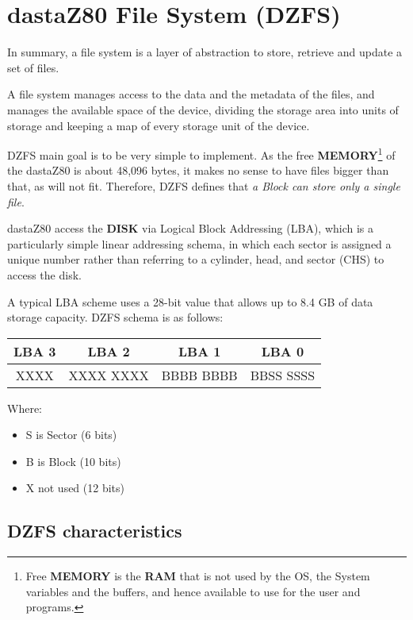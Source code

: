 \section{dastaZ80 File System (DZFS)}
In summary, a file system is a layer of abstraction to store, retrieve and
update a set of files.

A file system manages access to the data and the metadata of the files, and
manages the available space of the device, dividing the storage area into
units of storage and keeping a map of every storage unit of the device.

DZFS main goal is to be very simple to implement. As the free
\textbf{MEMORY}\footnote{Free \textbf{MEMORY} is the \textbf{RAM} that is not
used by the OS, the System variables and the buffers, and hence available to use
for the user and programs.} of the dastaZ80 is about 48,096 bytes, it makes no
sense to have files bigger than that, as will not fit. Therefore, DZFS defines
that \textit{a Block can store only a single file}.

dastaZ80 access the \textbf{DISK} via Logical Block Addressing (LBA), which
is a particularly simple linear addressing schema, in which each sector is
assigned a unique number rather than referring to a cylinder, head, and
sector (CHS) to access the disk.

A typical LBA scheme uses a 28-bit value that allows up to 8.4 GB of data
storage capacity. DZFS schema is as follows:

\begin{tabular}{ c c c c }
    \hline
    LBA 3 & LBA 2 & LBA 1 & LBA 0\\
    \hline
    XXXX & XXXX XXXX & BBBB BBBB & BBSS SSSS\\
    \hline
\end{tabular}

Where:

\begin{itemize}
    \item S is Sector (6 bits)
    \item B is Block (10 bits)
    \item X not used (12 bits)
\end{itemize}

    \subsection{DZFS characteristics}

